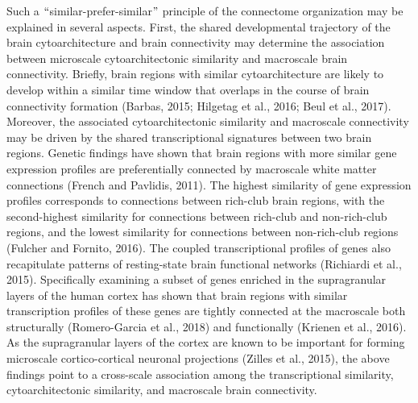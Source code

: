 \begin{refsection}
Such a $``$similar-prefer-similar$"$  principle of the connectome organization may be explained in several aspects. First, the shared developmental trajectory of the brain cytoarchitecture and brain connectivity may determine the association between microscale cytoarchitectonic similarity and macroscale brain connectivity. Briefly, brain regions with similar cytoarchitecture are likely to develop within a similar time window that overlaps in the course of brain connectivity formation (Barbas, 2015; Hilgetag et al., 2016; Beul et al., 2017). Moreover, the associated cytoarchitectonic similarity and macroscale connectivity may be driven by the shared transcriptional signatures between two brain regions. Genetic findings have shown that brain regions with more similar gene expression profiles are preferentially connected by macroscale white matter connections (French and Pavlidis, 2011). The highest similarity of gene expression profiles corresponds to connections between rich-club brain regions, with the second-highest similarity for connections between rich-club and non-rich-club regions, and the lowest similarity for connections between non-rich-club regions (Fulcher and Fornito, 2016). The coupled transcriptional profiles of genes also recapitulate patterns of resting-state brain functional networks (Richiardi et al., 2015). Specifically examining a subset of genes enriched in the supragranular layers of the human cortex has shown that brain regions with similar transcription profiles of these genes are tightly connected at the macroscale both structurally (Romero-Garcia et al., 2018) and functionally (Krienen et al., 2016). As the supragranular layers of the cortex are known to be important for forming microscale cortico-cortical neuronal projections (Zilles et al., 2015), the above findings point to a cross-scale association among the transcriptional similarity, cytoarchitectonic similarity, and macroscale brain connectivity.


\end{refsection}
